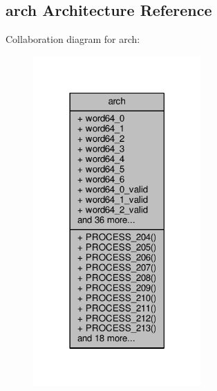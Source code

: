 \subsection{arch Architecture Reference}
\label{classpack__56__to__64_1_1arch}


Collaboration diagram for arch\+:\nopagebreak
\begin{figure}[H]
\begin{center}
\leavevmode
\includegraphics[width=182pt]{da/d19/classpack__56__to__64_1_1arch__coll__graph}
\end{center}
\end{figure}
